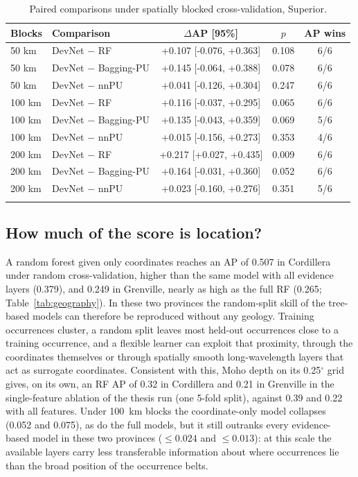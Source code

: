 \documentclass[pdflatex,sn-apa]{sn-jnl}
\begin{document}
\begin{table}[t]
\caption{Paired comparisons under spatially blocked cross-validation, Superior.}\label{tab:spatial-boot}
\footnotesize
\begin{tabular*}{0.8\textwidth}{@{\extracolsep\fill}llccc}
\toprule
Blocks & Comparison & $\Delta$AP [95\%] & $p$ & AP wins \\
\midrule
50 km & DevNet $-$ RF & +0.107 [-0.076, +0.363] & 0.108 & 6/6 \\
50 km & DevNet $-$ Bagging-PU & +0.145 [-0.064, +0.388] & 0.078 & 6/6 \\
50 km & DevNet $-$ nnPU & +0.041 [-0.126, +0.304] & 0.247 & 6/6 \\
100 km & DevNet $-$ RF & +0.116 [-0.037, +0.295] & 0.065 & 6/6 \\
100 km & DevNet $-$ Bagging-PU & +0.135 [-0.043, +0.359] & 0.069 & 5/6 \\
100 km & DevNet $-$ nnPU & +0.015 [-0.156, +0.273] & 0.353 & 4/6 \\
200 km & DevNet $-$ RF & +0.217 [+0.027, +0.435] & 0.009 & 6/6 \\
200 km & DevNet $-$ Bagging-PU & +0.164 [-0.031, +0.360] & 0.052 & 6/6 \\
200 km & DevNet $-$ nnPU & +0.023 [-0.160, +0.276] & 0.351 & 5/6 \\
\botrule
\end{tabular*}
\end{table}

\subsection{How much of the score is location?}\label{sec:res-geography}

A random forest given only coordinates reaches an AP of 0.507 in Cordillera under random cross-validation, higher than the same model with all evidence layers (0.379), and 0.249 in Grenville, nearly as high as the full RF (0.265; Table~\ref{tab:geography}). In these two provinces the random-split skill of the tree-based models can therefore be reproduced without any geology. Training occurrences cluster, a random split leaves most held-out occurrences close to a training occurrence, and a flexible learner can exploit that proximity, through the coordinates themselves or through spatially smooth long-wavelength layers that act as surrogate coordinates. Consistent with this, Moho depth on its 0.25$^\circ$ grid gives, on its own, an RF AP of 0.32 in Cordillera and 0.21 in Grenville in the single-feature ablation of the thesis run (one 5-fold split), against 0.39 and 0.22 with all features. Under 100~km blocks the coordinate-only model collapses (0.052 and 0.075), as do the full models, but it still outranks every evidence-based model in these two provinces ($\leq 0.024$ and $\leq 0.013$): at this scale the available layers carry less transferable information about where occurrences lie than the broad position of the occurrence belts.
\end{document}
